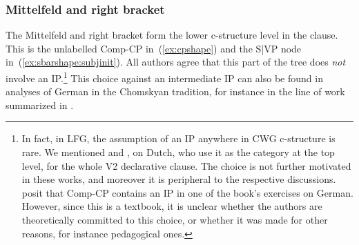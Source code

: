 \documentclass[output=paper,hidelinks]{langscibook}
\begin{document}
\subsubsection{Mittelfeld and right bracket\label{sec:Germanic:mfrb}}

The Mittelfeld and right bracket form the lower c-structure level in
the clause. This is the unlabelled Comp-CP in~(\ref{ex:cpshape}) and
the S|VP node in~(\ref{ex:sbarshape:subjinit}). All authors agree that
this part of the tree does \textit{not} involve an IP.\footnote{In
fact, in LFG, the assumption of an IP anywhere in CWG c-structure is
rare. We mentioned  and \citet{jones:2020:lfg},
on Dutch, who use it as the category at the top level, for the whole
V2 declarative clause. The choice is not further motivated in these
works, and moreover it is peripheral to the respective
discussions. \citet{BresnanEtAl2016} posit that Comp-CP contains an IP
in one of the book's exercises on German. However, since this is a textbook, it is
unclear whether the authors are theoretically committed to this
choice, or whether it was made for other reasons, for instance
pedagogical ones.} This choice against an intermediate IP can also be
found in analyses of German in the Chomskyan tradition, for instance
in the line of work summarized in \citet[see §2.2 therein for an
  overview of the arguments]{haider:2010}.
\end{document}

